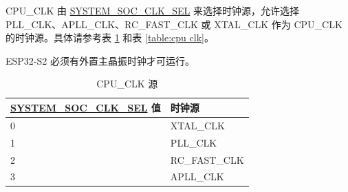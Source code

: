 \documentclass[main\_\_CN.tex]{subfiles}
\begin{document}
CPU\_CLK 由 \hyperref[fielddesc:SYSTEMSOCCLKSEL]{SYSTEM\_SOC\_CLK\_SEL} 来选择时钟源，允许选择 PLL\_CLK、APLL\_CLK、RC\_FAST\_CLK 或 XTAL\_CLK 作为 CPU\_CLK 的时钟源。具体请参考表 \ref{table:cpu clksrc} 和表 \ref{table:cpu clk}。

\begin{tiplisting}
ESP32-S2 必须有外置主晶振时钟才可运行。
\end{tiplisting}

\begin{longtable}[c]{|p{8.5cm}|p{7.5cm}| }
       \caption{CPU\_CLK 源}
		\label{table:cpu clksrc} \\
	    \hline
        \rowcolor{lightgray}
        \hyperref[fielddesc:SYSTEMSOCCLKSEL]{SYSTEM\_SOC\_CLK\_SEL} 值 & 时钟源 \\
        \hline
        0 & XTAL\_CLK \\
        \hline
        1 & PLL\_CLK \\
        \hline
        2 & RC\_FAST\_CLK \\
        \hline
        3 & APLL\_CLK \\
        \hline
\end{longtable}
\end{document}
